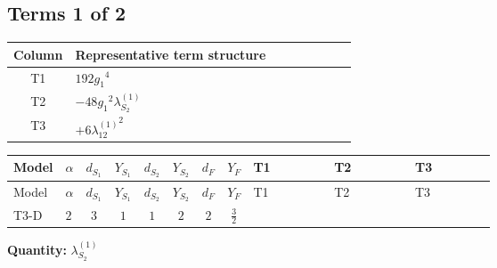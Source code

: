\documentclass[8pt]{article}
\begin{document}
\begin{landscape}
\subsection*{Terms 1 of 2}
\begin{center}
\begin{tabular}{@{}c >{\raggedright\arraybackslash}p{0.82\linewidth}@{}}
\toprule
Column & Representative term structure \\
\midrule
T1 & \(\displaystyle 192 {g_1}^4\) \\
\midrule
T2 & \(\displaystyle -48 {g_1}^2 {\lambda_{S_2}^{(1)}}\) \\
\midrule
T3 & \(\displaystyle +6 {\lambda_{12}^{(1)}}^2\) \\
\midrule
\bottomrule
\end{tabular}
\end{center}
\smallskip
\tiny
\begin{longtable}{@{}llcccccc >{\raggedright\arraybackslash}p{0.21\linewidth} >{\raggedright\arraybackslash}p{0.21\linewidth} >{\raggedright\arraybackslash}p{0.21\linewidth}@{}}
\toprule
Model & $\alpha$ & $d_{S_1}$ & $Y_{S_1}$ & $d_{S_2}$ & $Y_{S_2}$ & $d_F$ & $Y_F$ & T1 & T2 & T3 \\
\midrule
\endfirsthead
\toprule
Model & $\alpha$ & $d_{S_1}$ & $Y_{S_1}$ & $d_{S_2}$ & $Y_{S_2}$ & $d_F$ & $Y_F$ & T1 & T2 & T3 \\
\midrule
\endhead
T3-D & $2$ & $3$ & $1$ & $1$ & $2$ & $2$ & $\frac{3}{2}$ & \scriptsize\adjustbox{max width=\linewidth}{$\begin{gathered} 192 {g_1}^4\end{gathered}$} & \scriptsize\adjustbox{max width=\linewidth}{$\begin{gathered} -48 {g_1}^2 {\lambda_{S_2}^{(1)}}\end{gathered}$} & \scriptsize\adjustbox{max width=\linewidth}{$\begin{gathered} +6 {\lambda_{12}^{(1)}}^2\end{gathered}$} \\
\midrule
\bottomrule
\end{longtable}
\clearpage
\noindent\textbf{Quantity: }$\lambda_{S_2}^{(1)}$\par\smallskip

\end{landscape}
\end{document}
